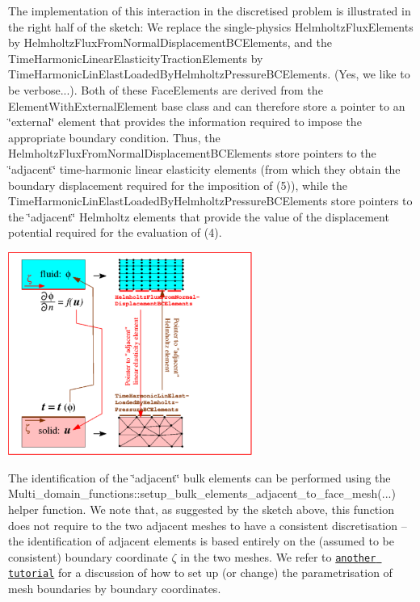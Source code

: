 The implementation of this interaction in the discretised problem is illustrated in the right half of the sketch\+: We replace the single-\/physics {\ttfamily Helmholtz\+Flux\+Elements} by {\ttfamily Helmholtz\+Flux\+From\+Normal\+Displacement\+B\+C\+Elements}, and the {\ttfamily Time\+Harmonic\+Linear\+Elasticity\+Traction\+Elements} by {\ttfamily Time\+Harmonic\+Lin\+Elast\+Loaded\+By\+Helmholtz\+Pressure\+B\+C\+Elements}. (Yes, we like to be verbose...). Both of these {\ttfamily Face\+Elements} are derived from the {\ttfamily Element\+With\+External\+Element} base class and can therefore store a pointer to an \char`\"{}external\char`\"{} element that provides the information required to impose the appropriate boundary condition. Thus, the {\ttfamily Helmholtz\+Flux\+From\+Normal\+Displacement\+B\+C\+Elements} store pointers to the \char`\"{}adjacent\char`\"{} time-\/harmonic linear elasticity elements (from which they obtain the boundary displacement required for the imposition of (5)), while the {\ttfamily Time\+Harmonic\+Lin\+Elast\+Loaded\+By\+Helmholtz\+Pressure\+B\+C\+Elements} store pointers to the \char`\"{}adjacent\char`\"{} Helmholtz elements that provide the value of the displacement potential required for the evaluation of (4).

 
\begin{DoxyImage}
\includegraphics[width=0.6\textwidth]{multi_physics}
\end{DoxyImage}


The identification of the \char`\"{}adjacent\char`\"{} bulk elements can be performed using the {\ttfamily Multi\+\_\+domain\+\_\+functions\+::setup\+\_\+bulk\+\_\+elements\+\_\+adjacent\+\_\+to\+\_\+face\+\_\+mesh}(...) helper function. We note that, as suggested by the sketch above, this function does not require to the two adjacent meshes to have a consistent discretisation -- the identification of adjacent elements is based entirely on the (assumed to be consistent) boundary coordinate $ \zeta $ in the two meshes. We refer to \href{../../../poisson/fish_poisson2/html/index.html#boundary_coords}{\tt another tutorial} for a discussion of how to set up (or change) the parametrisation of mesh boundaries by boundary coordinates.




